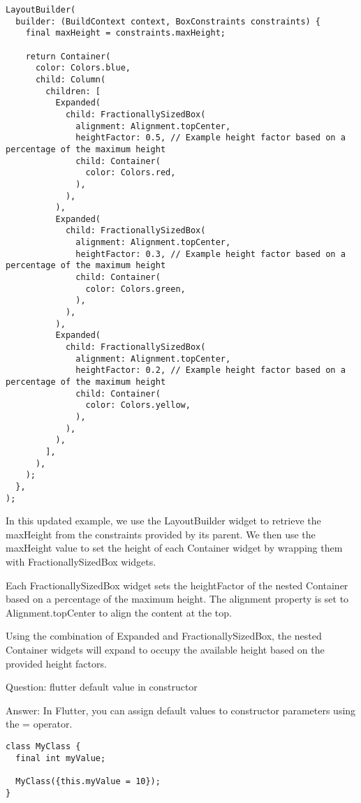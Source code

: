 \begin{lstlisting}
LayoutBuilder(
  builder: (BuildContext context, BoxConstraints constraints) {
    final maxHeight = constraints.maxHeight;

    return Container(
      color: Colors.blue,
      child: Column(
        children: [
          Expanded(
            child: FractionallySizedBox(
              alignment: Alignment.topCenter,
              heightFactor: 0.5, // Example height factor based on a percentage of the maximum height
              child: Container(
                color: Colors.red,
              ),
            ),
          ),
          Expanded(
            child: FractionallySizedBox(
              alignment: Alignment.topCenter,
              heightFactor: 0.3, // Example height factor based on a percentage of the maximum height
              child: Container(
                color: Colors.green,
              ),
            ),
          ),
          Expanded(
            child: FractionallySizedBox(
              alignment: Alignment.topCenter,
              heightFactor: 0.2, // Example height factor based on a percentage of the maximum height
              child: Container(
                color: Colors.yellow,
              ),
            ),
          ),
        ],
      ),
    );
  },
);
\end{lstlisting}

In this updated example, we use the LayoutBuilder widget to retrieve the maxHeight from the constraints provided 
by its parent. We then use the maxHeight value to set the height of each Container widget by wrapping them 
with FractionallySizedBox widgets.

Each FractionallySizedBox widget sets the heightFactor of the nested Container based on a percentage of the 
maximum height. The alignment property is set to Alignment.topCenter to align the content at the top.

Using the combination of Expanded and FractionallySizedBox, the nested Container widgets will expand to occupy 
the available height based on the provided height factors.


Question: flutter default value in constructor

Answer: In Flutter, you can assign default values to constructor parameters using the = operator. 

\begin{lstlisting}
class MyClass {
  final int myValue;

  MyClass({this.myValue = 10});
}
\end{lstlisting}

